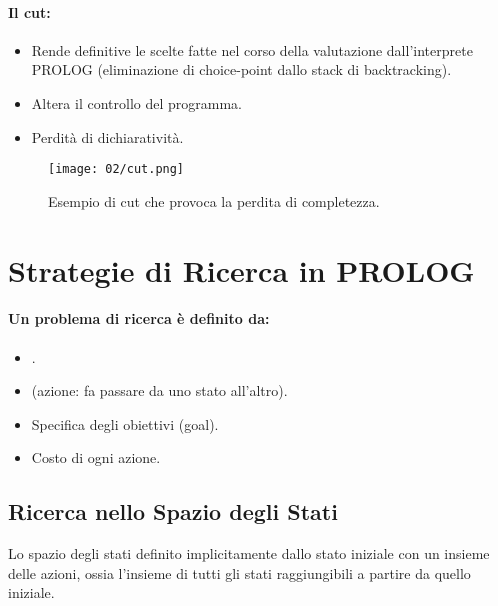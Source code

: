 \paragraph{Il cut:}

\begin{itemize}
  \item Rende definitive le scelte fatte nel corso della valutazione dall'interprete PROLOG (eliminazione di choice-point dallo stack di backtracking). 
  \item Altera il controllo del programma. 
  \item Perdità di dichiaratività.
\end{itemize}

\begin{figure}[h]
    \centering
    \texttt{[image: 02/cut.png]}
    \caption{Esempio di cut che provoca la perdita di completezza.}
\end{figure}

\section{Strategie di Ricerca in PROLOG}

\paragraph{Un problema di ricerca è definito da:} 
    \begin{itemize}
    \item {}. 
    \item {} (azione: fa passare da uno stato all'altro). 
    \item Specifica degli obiettivi (goal).
    \item Costo di ogni azione.
    \end{itemize}


\subsection{Ricerca nello Spazio degli Stati}

Lo spazio degli stati definito implicitamente dallo stato iniziale con un insieme delle azioni, ossia l'insieme di tutti gli stati raggiungibili a partire da quello iniziale.


